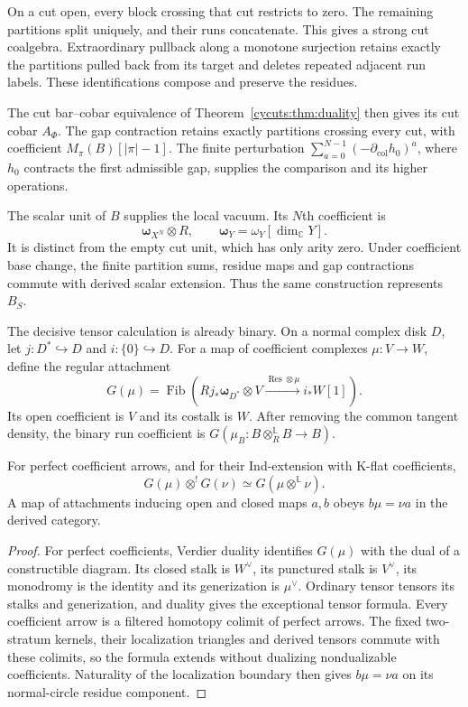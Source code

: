 On a cut open, every block crossing that cut restricts to zero.
The remaining partitions split uniquely, and their runs concatenate.
This gives a strong cut coalgebra. Extraordinary pullback along a
monotone surjection retains exactly the partitions pulled back
from its target and deletes repeated adjacent run labels.
These identifications compose and preserve the residues.

The cut bar--cobar equivalence of Theorem~\ref{cycuts:thm:duality}
then gives its cut cobar $A_\Phi$.
The gap contraction retains exactly partitions crossing every
cut, with coefficient $M_\pi(B)[|\pi|-1]$.
The finite perturbation
$\sum_{a=0}^{N-1}(-\partial_{\mathrm{col}}h_0)^a$,
where $h_0$ contracts the first admissible gap, supplies the
comparison and its higher operations.

The scalar unit of $B$ supplies the local vacuum. Its $N$th coefficient is
\[
 \boldsymbol\omega_{X^N}\otimes R,
 \qquad \boldsymbol\omega_Y=\omega_Y[\dim_{\mathbb C}Y].
\]
It is distinct from the empty cut unit, which has only arity zero.
Under coefficient base change, the finite partition sums, residue
maps and gap contractions commute with derived scalar extension.
Thus the same construction represents $B_S$.

The decisive tensor calculation is already binary. On a normal
complex disk $D$, let $j:D^*\hookrightarrow D$ and
$i:\{0\}\hookrightarrow D$. For a map of coefficient complexes
$\mu:V\to W$, define the regular attachment
\begin{equation}\label{cyrec:eq:regular-attachment}
 G(\mu)=\operatorname{Fib}\left(
 Rj_*\boldsymbol\omega_{D^*}\otimes V
      \xrightarrow{\operatorname{Res}\otimes\mu}i_*W[1]\right).
\end{equation}
Its open coefficient is $V$ and its costalk is $W$.
After removing the common tangent density, the binary run
coefficient is $G(\mu_B:B\otimes_R^{\mathbb L}B\to B)$.

\begin{lemma}\label{cyrec:lem:attachment-tensor}
For perfect coefficient arrows, and for their Ind-extension with
K-flat coefficients,
\[
 G(\mu)\otimes^!G(\nu)\simeq G(\mu\otimes^{\mathbb L}\nu).
\]
A map of attachments inducing open and closed maps $a,b$ obeys
$b\mu=\nu a$ in the derived category.
\end{lemma}

\begin{proof}
For perfect coefficients, Verdier duality identifies $G(\mu)$
with the dual of a constructible diagram. Its closed stalk is
$W^\vee$, its punctured stalk is $V^\vee$, its monodromy is the
identity and its generization is $\mu^\vee$. Ordinary tensor tensors its stalks
and generization, and duality gives the exceptional tensor formula.
Every coefficient arrow is a filtered homotopy colimit of perfect
arrows. The fixed two-stratum kernels, their localization triangles
and derived tensors commute with these colimits, so the formula
extends without dualizing nondualizable coefficients.
Naturality of the localization boundary then gives $b\mu=\nu a$
on its normal-circle residue component.
\end{proof}

